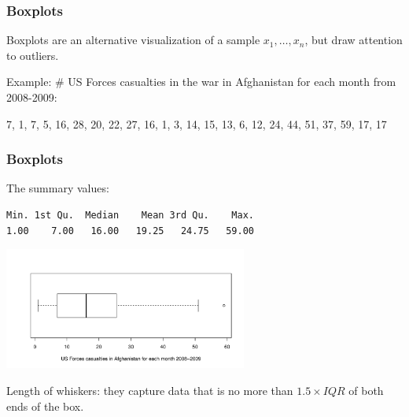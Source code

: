 \documentclass[handout]{beamer}
\newcommand{\blue}[1]{\textcolor{blue2}{#1}}
\begin{document}
\begin{frame}
\frametitle{Boxplots}
\blue{Boxplots} are an alternative visualization of a sample $x_1,\ldots,x_n$, but draw attention to outliers.

\vspace{0.5cm}

\pause Example: \# US Forces casualties in the war in Afghanistan for each month from 2008-2009:  

\vspace{0.5cm}

7, 1, 7, 5, 16, 28, 20, 22, 27, 16, 1, 3, 14, 15, 13, 6, 12, 24, 44, 51, 37, 59, 17, 17


\end{frame}


\begin{frame}[fragile]
\frametitle{Boxplots}

The summary values:
\begin{verbatim}
Min. 1st Qu.  Median    Mean 3rd Qu.    Max. 
1.00    7.00   16.00   19.25   24.75   59.00 
\end{verbatim}

\pause \begin{center}
\includegraphics[height=4cm]{figure/afghanistan.pdf}
\end{center}
\pause Length of \blue{whiskers}: they capture data that is no more than $1.5 \times IQR$ of both ends of the box.  

\end{frame}
\end{document}
